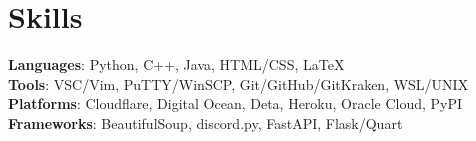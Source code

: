 \documentclass[letterpaper,11pt]{article}
\begin{document}
\section{Skills}
\begin{itemize}[leftmargin=0.15in, label={}]
	\small{\item{
		            \textbf{Languages}{: Python, C++, Java, HTML/CSS, \LaTeX} \\
		            \textbf{Tools}{: VSC/Vim, PuTTY/WinSCP, Git/GitHub/GitKraken, WSL/UNIX} \\
		            \textbf{Platforms}{: Cloudflare, Digital Ocean, Deta, Heroku, Oracle Cloud, PyPI} \\
		            \textbf{Frameworks}{: BeautifulSoup, discord.py, FastAPI, Flask/Quart} \\
		      }}
\end{itemize}
\end{document}
